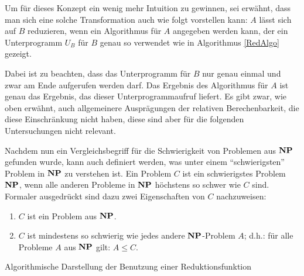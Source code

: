 Um für dieses Konzept ein wenig mehr Intuition zu gewinnen, sei
erwähnt, dass man sich eine solche Transformation auch wie folgt
vorstellen kann: $A$ lässt sich auf $B$ reduzieren, wenn ein
Algorithmus für $A$ angegeben werden kann, der ein Unterprogramm $U_B$
für $B$ genau so verwendet wie in Algorithmus \ref{RedAlgo} gezeigt.

Dabei ist zu beachten, dass das Unterprogramm für $B$ nur genau einmal
und zwar am Ende aufgerufen werden darf.  Das Ergebnis des Algorithmus
für $A$ ist genau das Ergebnis, das dieser Unterprogrammaufruf
liefert.  Es gibt zwar, wie oben erwähnt, auch allgemeinere
Ausprägungen der relativen Berechenbarkeit, die diese Einschränkung
nicht haben, diese sind aber für die folgenden Untersuchungen nicht
relevant.

Nachdem nun ein Vergleichsbegriff für die Schwierigkeit von Problemen
aus $\mathbf{N}\mathbf{P}$ gefunden wurde, kann auch definiert werden, was unter einem
"`schwierigsten"' Problem in $\mathbf{N}\mathbf{P}$ zu verstehen ist. Ein Problem $C$
ist ein schwierigstes Problem $\mathbf{N}\mathbf{P}$, wenn alle anderen Probleme in
$\mathbf{N}\mathbf{P}$ höchstens so schwer wie $C$ sind. Formaler ausgedrückt sind dazu
zwei Eigenschaften von $C$ nachzuweisen:

\begin{enumerate}[{\sffamily(1)}]
\item $C$ ist ein Problem aus $\mathbf{N}\mathbf{P}$.
\item $C$ ist mindestens so schwierig wie jedes andere $\mathbf{N}\mathbf{P}$-Problem
$A$; d.h.: für alle Probleme $A$ aus $\mathbf{N}\mathbf{P}$ gilt: $A \le C$.
\end{enumerate}

\begin{algorithm}
\caption{Algorithmische Darstellung der Benutzung einer Reduktionsfunktion}
\label{RedAlgo}
%
\BlankLine
{}
\end{algorithm}

